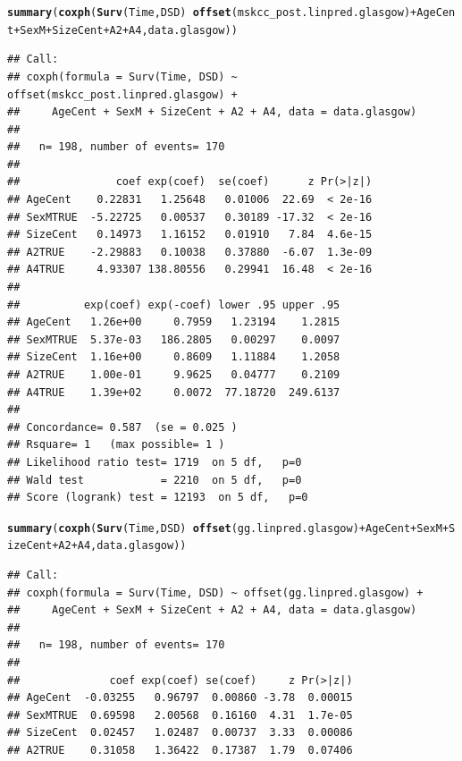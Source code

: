 \documentclass{article}\usepackage[]{graphicx}\usepackage[]{color}
\makeatletter
\newcommand{\hlopt}[1]{\textcolor[rgb]{0,0,0}{#1}}%
\newcommand{\hlstd}[1]{\textcolor[rgb]{0.345,0.345,0.345}{#1}}%
\newcommand{\hlkwd}[1]{\textcolor[rgb]{0.737,0.353,0.396}{\textbf{#1}}}%
\newenvironment{kframe}{%
 \def\at@end@of@kframe{}%
 \ifinner\ifhmode%
  \def\at@end@of@kframe{\end{minipage}}%
  \begin{minipage}{\columnwidth}%
 \fi\fi%
 \def\FrameCommand##1{\hskip\@totalleftmargin \hskip-\fboxsep
 \colorbox{shadecolor}{##1}\hskip-\fboxsep
     \hskip-\linewidth \hskip-\@totalleftmargin \hskip\columnwidth}%
 \MakeFramed {\advance\hsize-\width
   \@totalleftmargin\z@ \linewidth\hsize
   \@setminipage}}%
 {\par\unskip\endMakeFramed%
 \at@end@of@kframe}
\newenvironment{knitrout}{}{} %
\makeatother
\begin{document}
\begin{knitrout}
\begin{kframe}
{\ttfamily\noindent\bfseries\color{errorcolor}{\#\# Error in fitter(X, Y, strats, offset, init, control, weights = weights, : NA/NaN/Inf in foreign function call (arg 6)}}\begin{alltt}
\hlkwd{summary}\hlstd{(}\hlkwd{coxph}\hlstd{(}\hlkwd{Surv}\hlstd{(Time, DSD)} \hlopt{~} \hlkwd{offset}\hlstd{(mskcc_post.linpred.glasgow)} \hlopt{+} \hlstd{AgeCent} \hlopt{+} \hlstd{SexM} \hlopt{+} \hlstd{SizeCent} \hlopt{+} \hlstd{A2} \hlopt{+} \hlstd{A4, data.glasgow))}
\end{alltt}
\begin{verbatim}
## Call:
## coxph(formula = Surv(Time, DSD) ~ offset(mskcc_post.linpred.glasgow) + 
##     AgeCent + SexM + SizeCent + A2 + A4, data = data.glasgow)
## 
##   n= 198, number of events= 170 
## 
##               coef exp(coef)  se(coef)      z Pr(>|z|)
## AgeCent    0.22831   1.25648   0.01006  22.69  < 2e-16
## SexMTRUE  -5.22725   0.00537   0.30189 -17.32  < 2e-16
## SizeCent   0.14973   1.16152   0.01910   7.84  4.6e-15
## A2TRUE    -2.29883   0.10038   0.37880  -6.07  1.3e-09
## A4TRUE     4.93307 138.80556   0.29941  16.48  < 2e-16
## 
##          exp(coef) exp(-coef) lower .95 upper .95
## AgeCent   1.26e+00     0.7959   1.23194    1.2815
## SexMTRUE  5.37e-03   186.2805   0.00297    0.0097
## SizeCent  1.16e+00     0.8609   1.11884    1.2058
## A2TRUE    1.00e-01     9.9625   0.04777    0.2109
## A4TRUE    1.39e+02     0.0072  77.18720  249.6137
## 
## Concordance= 0.587  (se = 0.025 )
## Rsquare= 1   (max possible= 1 )
## Likelihood ratio test= 1719  on 5 df,   p=0
## Wald test            = 2210  on 5 df,   p=0
## Score (logrank) test = 12193  on 5 df,   p=0
\end{verbatim}
\begin{alltt}
\hlkwd{summary}\hlstd{(}\hlkwd{coxph}\hlstd{(}\hlkwd{Surv}\hlstd{(Time, DSD)} \hlopt{~} \hlkwd{offset}\hlstd{(gg.linpred.glasgow)} \hlopt{+} \hlstd{AgeCent} \hlopt{+} \hlstd{SexM} \hlopt{+} \hlstd{SizeCent} \hlopt{+} \hlstd{A2} \hlopt{+} \hlstd{A4, data.glasgow))}
\end{alltt}
\begin{verbatim}
## Call:
## coxph(formula = Surv(Time, DSD) ~ offset(gg.linpred.glasgow) + 
##     AgeCent + SexM + SizeCent + A2 + A4, data = data.glasgow)
## 
##   n= 198, number of events= 170 
## 
##              coef exp(coef) se(coef)     z Pr(>|z|)
## AgeCent  -0.03255   0.96797  0.00860 -3.78  0.00015
## SexMTRUE  0.69598   2.00568  0.16160  4.31  1.7e-05
## SizeCent  0.02457   1.02487  0.00737  3.33  0.00086
## A2TRUE    0.31058   1.36422  0.17387  1.79  0.07406

\end{verbatim}
\end{kframe}
\end{knitrout}
\end{document}
